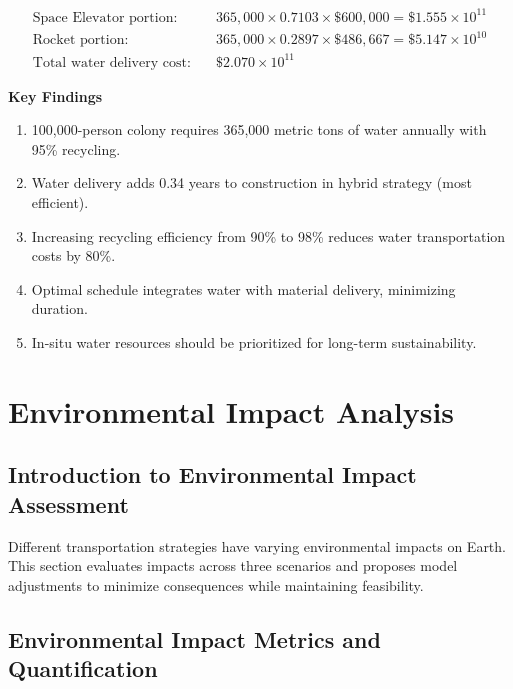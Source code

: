 \documentclass[12pt]{mcmthesis}
\begin{document}
\vspace{-10pt}
\begin{align*}
    \text{Space Elevator portion:}    & \quad 365,000 \times 0.7103 \times \$600,000 = \$1.555 \times 10^{11} \\
    \text{Rocket portion:}            & \quad 365,000 \times 0.2897 \times \$486,667 = \$5.147 \times 10^{10} \\
    \text{Total water delivery cost:} & \quad \$2.070 \times 10^{11}
\end{align*}
\vspace{-10pt}

\textbf{Key Findings}

\begin{enumerate}
    \item 100,000-person colony requires 365,000 metric tons of water annually with 95\% recycling.
    \item Water delivery adds 0.34 years to construction in hybrid strategy (most efficient).
    \item Increasing recycling efficiency from 90\% to 98\% reduces water transportation costs by 80\%.
    \item Optimal schedule integrates water with material delivery, minimizing duration.
    \item In-situ water resources should be prioritized for long-term sustainability.
\end{enumerate}

\section{Environmental Impact Analysis}

\subsection{Introduction to Environmental Impact Assessment}

Different transportation strategies have varying environmental impacts on Earth. This section evaluates impacts across three scenarios and proposes model adjustments to minimize consequences while maintaining feasibility.

\subsection{Environmental Impact Metrics and Quantification}
\end{document}
